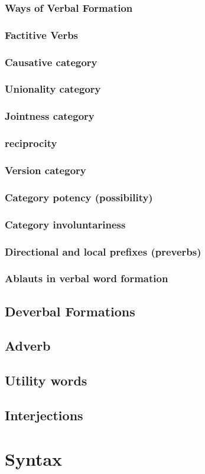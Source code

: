 \documentclass[a4paper,12pt]{book}
\newcommand{\1}[1]{\textbf{\emph{#1}}} %
\newcommand{\2}[1]{\textbf{[#1]}} %
\newcommand{\3}[1]{\fontsize{11pt}{0cm}\textbf{\emph{#1}}} %
\newcommand{\4}[1]{\fontsize{10pt}{0cm}\emph{#1}}	%
\newcommand{\5}[1]{\textbf{/#1/}} %
\newcommand{\6}[1]{\textbf{[#1]}} %
\newcommand{\7}[1]{\fontsize{12pt}{0cm}\emph{#1}} %
\newcommand{\8}[1]{\fontsize{12pt}{0cm}`#1'} %
\newcommand{\9}[1]{\fontsize{12pt}{0cm}(lit. `#1')} %
\begin{document}
\subsection{Ways of Verbal Formation}
\subsection{Factitive Verbs}
\subsection{Causative category}
\subsection{Unionality category}
\subsection{Jointness category}
\subsection{reciprocity}
\subsection{Version category}
\subsection{Category potency (possibility)}
\subsection{Category involuntariness}
\subsection{Directional and local prefixes (preverbs)}
\subsection{Ablauts in verbal word formation}

\section{Deverbal Formations}
\section{Adverb}
\section{Utility words}
\section{Interjections}
\chapter{Syntax}
\end{document}
